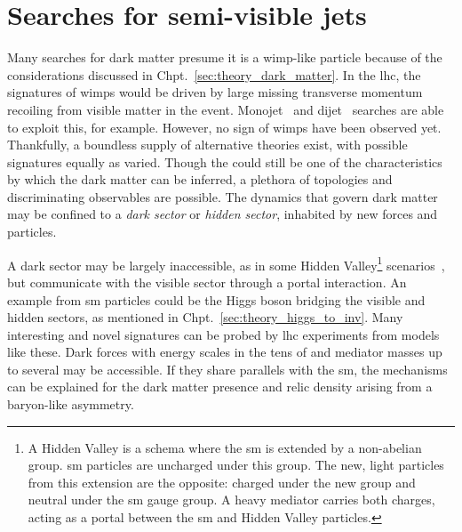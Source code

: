 

\section{Searches for semi-visible jets}
\label{sec:theory_svj}

Many searches for dark matter presume it is a \acrshort{wimp}-like particle because of the considerations discussed in Chpt.~\ref{sec:theory_dark_matter}. In the \acrshort{lhc}, the signatures of \glspl{wimp} would be driven by large missing transverse momentum recoiling from visible matter in the event. Monojet~\cite{Khachatryan:2014rra} and dijet~\cite{Sirunyan:2016iap} searches are able to exploit this, for example. However, no sign of \glspl{wimp} have been observed yet. Thankfully, a boundless supply of alternative theories exist, with possible signatures equally as varied. Though the \ptmiss could still be one of the characteristics by which the dark matter can be inferred, a plethora of topologies and discriminating observables are possible. The dynamics that govern dark matter may be confined to a \emph{dark sector} or \emph{hidden sector}, inhabited by new forces and particles.

A dark sector may be largely inaccessible, as in some Hidden Valley\footnote{A Hidden Valley is a schema where the \acrlong{sm} is extended by a non-abelian group. \acrshort{sm} particles are uncharged under this group. The new, light particles from this extension are the opposite: charged under the new group and neutral under the \acrshort{sm} gauge group. A heavy mediator carries both charges, acting as a portal between the \acrlong{sm} and Hidden Valley particles.} scenarios~\cite{Strassler:2006im}, but communicate with the visible sector through a portal interaction. An example from \acrshort{sm} particles could be the Higgs boson bridging the visible and hidden sectors, as mentioned in Chpt.~\ref{sec:theory_higgs_to_inv}. Many interesting and novel signatures can be probed by \acrshort{lhc} experiments from models like these. Dark forces with energy scales in the tens of \GeVns and mediator masses up to several \TeVns may be accessible. If they share parallels with the \acrlong{sm}, the mechanisms can be explained for the dark matter presence and relic density arising from a baryon-like asymmetry.


